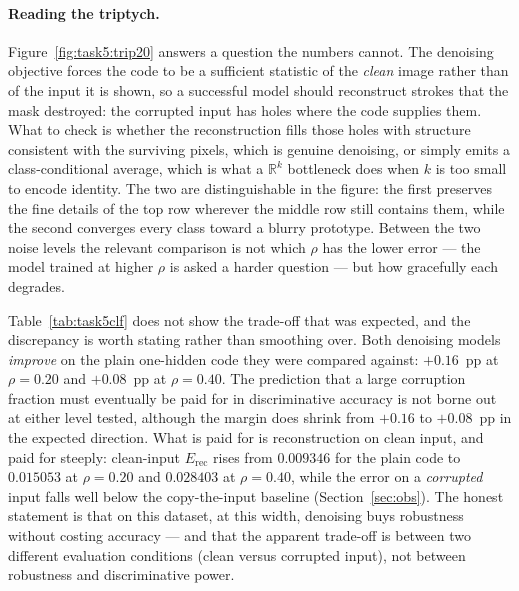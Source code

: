 \documentclass[11pt,a4paper]{article}
\newcommand{\R}{\mathbb{R}}\newcommand{\given}{\mid}\newcommand{\Acc}{\mathrm{Acc}}
\begin{document}
\paragraph{Reading the triptych.}
Figure~\ref{fig:task5:trip20} answers a question the numbers cannot.  The denoising objective
forces the code to be a sufficient statistic of the \emph{clean} image rather than of the input it
is shown, so a successful model should reconstruct strokes that the mask destroyed: the corrupted
input has holes where the code supplies them.  What to check is whether the reconstruction fills
those holes with structure consistent with the surviving pixels, which is genuine denoising, or
simply emits a class-conditional average, which is what a $\R^{k}$ bottleneck does when $k$ is too
small to encode identity.  The two are distinguishable in the figure: the first preserves the fine
details of the top row wherever the middle row still contains them, while the second converges
every class toward a blurry prototype.  Between the two noise levels the relevant comparison is not
which $\rho$ has the lower error --- the model trained at higher $\rho$ is asked a harder question
--- but how gracefully each degrades.

Table~\ref{tab:task5clf} does not show the trade-off that was expected, and the discrepancy is
worth stating rather than smoothing over.  Both denoising models \emph{improve} on the plain
one-hidden code they were compared against: $+0.16$~pp at $\rho=0.20$ and $+0.08$~pp at
$\rho=0.40$.  The prediction that a large corruption fraction must eventually be paid for in
discriminative accuracy is not borne out at either level tested, although the margin does shrink
from $+0.16$ to $+0.08$~pp in the expected direction.  What is paid for is reconstruction on clean
input, and paid for steeply: clean-input $E_{\mathrm{rec}}$ rises from $0.009346$ for the plain code
to $0.015053$ at $\rho=0.20$ and $0.028403$ at $\rho=0.40$, while the error on a \emph{corrupted}
input falls well below the copy-the-input baseline (Section~\ref{sec:obs}).  The honest statement
is that on this dataset, at this width, denoising buys robustness without costing accuracy --- and
that the apparent trade-off is between two different evaluation conditions (clean versus corrupted
input), not between robustness and discriminative power.
\end{document}
